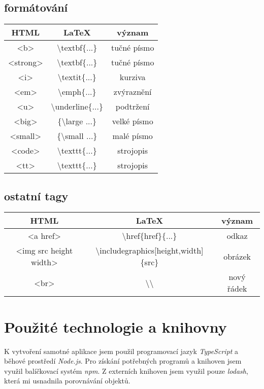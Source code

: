 \documentclass[a4paper,12pt]{article}
\newcommand{\zl}{\textbackslash}
\newcommand{\ls}{\textless}
\newcommand{\ps}{\textgreater}
\begin{document}
	\subsection{formátování}
	\begin{tabular}{|c|c|c|}
		\hline
		\textbf{HTML} & \textbf{\LaTeX} & \textbf{význam} \\
		\hline
		\ls b\ps & \zl textbf\{...\} & tučné písmo \\
		\hline
		\ls strong\ps & \zl textbf\{...\} & tučné písmo \\
		\hline
		\ls i\ps & \zl textit\{...\} & kurziva \\
		\hline
		\ls em\ps & \zl emph\{...\} & zvýraznění \\
		\hline
		\ls u\ps & \zl underline\{...\} & podtržení \\
		\hline
		\ls big\ps & \{\zl large ...\} & velké písmo \\
		\hline
		\ls small\ps & \{\zl small ...\} & malé písmo \\
		\hline
		\ls code\ps & \zl texttt\{...\} & strojopis \\
		\hline
		\ls tt\ps & \zl texttt\{...\} & strojopis \\
		\hline
	\end{tabular}

	\subsection{ostatní tagy}
	\begin{tabular}{|c|c|c|}
	\hline
	\textbf{HTML} & \textbf{\LaTeX} & \textbf{význam} \\
	\hline
	\ls a href\ps & \zl href\{href\}\{...\} & odkaz \\
	\hline
	\ls img src height width\ps & \zl includegraphics[height,width]\{src\} & obrázek \\
	\hline
	\ls br\ps & \zl\zl & nový řádek \\
	\hline
	\end{tabular}
	
	\section{Použité technologie a knihovny}
	K vytvoření samotné aplikace jsem použil programovací jazyk \textit{TypeScript} a běhové
	prostředí \textit{Node.js}. Pro získání potřebných programů a knihoven jsem využil balíčkovací systém \textit{npm}. Z externích knihoven jsem využil pouze \textit{lodash}, která mi usnadnila
	porovnávání objektů.
	
\end{document}

